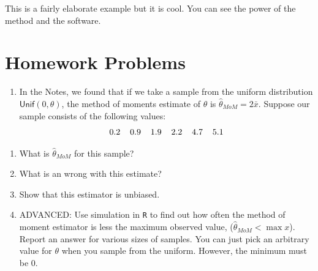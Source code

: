 \documentclass[
  letterpaper,
  DIV=11,
  numbers=noendperiod]{scrreprt}
\providecommand{\tightlist}{%
  \setlength{\itemsep}{0pt}\setlength{\parskip}{0pt}}\usepackage{longtable,booktabs,array}
\begin{document}
This is a fairly elaborate example but it is cool. You can see the power
of the method and the software.

\section{Homework Problems}\label{homework-problems-16}

\begin{enumerate}
\def\labelenumi{\arabic{enumi}.}
\tightlist
\item
  In the Notes, we found that if we take a sample from the uniform
  distribution \(\textsf{Unif}(0,\theta)\), the method of moments
  estimate of \(\theta\) is \(\hat{\theta}_{MoM}=2\bar{x}\). Suppose our
  sample consists of the following values: \[
  0.2 \hspace{0.4cm} 0.9 \hspace{0.4cm} 1.9 \hspace{0.4cm} 2.2 \hspace{0.4cm} 4.7 \hspace{0.4cm} 5.1
  \]
\end{enumerate}

\begin{enumerate}
\def\labelenumi{\alph{enumi})}
\tightlist
\item
  What is \(\hat{\theta}_{MoM}\) for this sample?\\
\item
  What is an wrong with this estimate?\\
\item
  Show that this estimator is unbiased.\\
\item
  ADVANCED: Use simulation in \texttt{R} to find out how often the
  method of moment estimator is less the maximum observed value,
  (\(\hat{\theta}_{MoM} < \max x\)). Report an answer for various sizes
  of samples. You can just pick an arbitrary value for \(\theta\) when
  you sample from the uniform. However, the minimum must be 0.
\end{enumerate}
\end{document}

